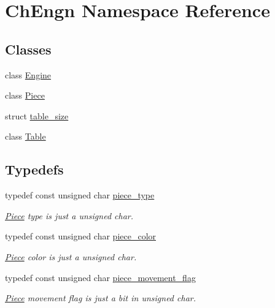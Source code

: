 \hypertarget{namespaceChEngn}{
\section{ChEngn Namespace Reference}
\label{namespaceChEngn}
}
\subsection*{Classes}
\begin{DoxyCompactItemize}
\item 
class \hyperlink{classChEngn_1_1Engine}{Engine}
\item 
class \hyperlink{classChEngn_1_1Piece}{Piece}
\item 
struct \hyperlink{structChEngn_1_1table__size}{table\_\-size}
\item 
class \hyperlink{classChEngn_1_1Table}{Table}
\end{DoxyCompactItemize}
\subsection*{Typedefs}
\begin{DoxyCompactItemize}
\item 
\hypertarget{namespaceChEngn_a2a35c185f259757a78e937575b8ed483}{
typedef const unsigned char \hyperlink{namespaceChEngn_a2a35c185f259757a78e937575b8ed483}{piece\_\-type}}
\label{namespaceChEngn_a2a35c185f259757a78e937575b8ed483}

\begin{DoxyCompactList}\small\item\em \hyperlink{classChEngn_1_1Piece}{Piece} type is just a unsigned char. \item\end{DoxyCompactList}\item 
\hypertarget{namespaceChEngn_a9c81426c0134a97288a226c122daf62f}{
typedef const unsigned char \hyperlink{namespaceChEngn_a9c81426c0134a97288a226c122daf62f}{piece\_\-color}}
\label{namespaceChEngn_a9c81426c0134a97288a226c122daf62f}

\begin{DoxyCompactList}\small\item\em \hyperlink{classChEngn_1_1Piece}{Piece} color is just a unsigned char. \item\end{DoxyCompactList}\item 
\hypertarget{namespaceChEngn_a491b2eba2f766087f4f28948005ab16a}{
typedef const unsigned char \hyperlink{namespaceChEngn_a491b2eba2f766087f4f28948005ab16a}{piece\_\-movement\_\-flag}}
\label{namespaceChEngn_a491b2eba2f766087f4f28948005ab16a}

\begin{DoxyCompactList}\small\item\em \hyperlink{classChEngn_1_1Piece}{Piece} movement flag is just a bit in unsigned char. \item\end{DoxyCompactList}\end{DoxyCompactItemize}
